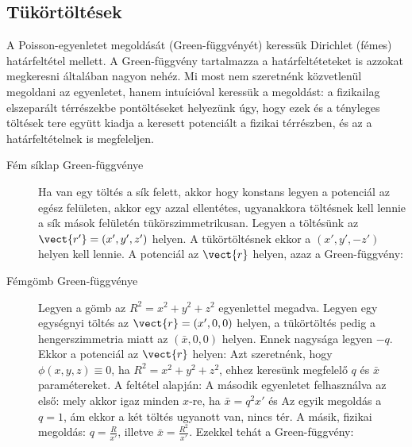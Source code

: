   \subsection{Tükörtöltések}
   
   A Poisson-egyenletet megoldását (Green-függvényét) keressük Dirichlet (fémes) határfeltétel mellett.
   A Green-függvény tartalmazza a határfeltéteteket is azzokat megkeresni általában nagyon nehéz.
   Mi most nem szeretnénk közvetlenül megoldani az egyenletet, hanem intuícióval keressük a megoldást: a fizikailag elszeparált térrészekbe pontöltéseket helyezünk úgy, hogy ezek és a tényleges töltések tere együtt kiadja a keresett potenciált a fizikai térrészben, és az a határfeltételnek is megfeleljen. 
   
   \begin{description}
    \item[Fém síklap Green-függvénye]
     Ha van egy töltés a sík felett, akkor hogy konstans legyen a potenciál az egész felületen, akkor egy azzal ellentétes, ugyanakkora töltésnek kell lennie a sík mások felületén tükörszimmetrikusan.
   Legyen a töltésünk az $\vect{r'}=(x',y',z')$ helyen.
   A tükörtöltésnek ekkor a $(x',y',-z')$ helyen kell lennie.
   A potenciál az $\vect{r}$ helyen, azaz a Green-függvény:
    
    \item[Fémgömb Green-függvénye]
     Legyen a gömb az $R^2=x^2+y^2+z^2$ egyenlettel megadva.
   Legyen egy egységnyi töltés az $\vect{r}=(x',0,0)$ helyen, a tükörtöltés pedig a hengerszimmetria miatt az $(\bar{x},0,0)$ helyen.
   Ennek nagysága legyen $-q$.
   Ekkor a potenciál az $\vect{r}$ helyen:
     Azt szeretnénk, hogy $\phi(x,y,z)\equiv 0$, ha $R^2=x^2+y^2+z^2$, ehhez keresünk megfelelő $q$ és $\bar{x}$ paramétereket.
   A feltétel alapján:
     A második egyenletet felhasználva az első:
     mely akkor igaz minden $x$-re, ha $\bar{x}=q^2x'$ és 
     Az egyik megoldás a $q=1$, ám ekkor a két töltés ugyanott van, nincs tér.
   A másik, fizikai megoldás: $q=\frac{R}{x'}$, illetve $\bar{x}=\frac{R^2}{x'}$.
   Ezekkel tehát a Green-függvény:
     

\end{description}
